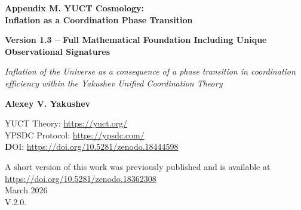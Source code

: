 \documentclass[12pt]{article}
\theoremstyle{remark}
\begin{document}
	
	\begin{titlepage}
		\begin{center}
			\vspace*{0cm}
			
			\Huge\textbf{Appendix M. YUCT Cosmology: \\ Inflation as a Coordination Phase Transition}
			
			\vspace{0cm}
			
			\Large\textbf{Version 1.3 – Full Mathematical Foundation Including Unique Observational Signatures}
			
			\vspace{0cm}
			
			\small\textit{Inflation of the Universe as a consequence of a phase transition in coordination efficiency within the Yakushev Unified Coordination Theory}
			
			\vspace{0,5cm}
			
			\small\textbf{Alexey V. Yakushev}
			
	YUCT Theory: \url{https://yuct.org/}\\
YPSDC Protocol: \url{https://ypsdc.com/}\\


\vspace{2cm}
\textbf DOI: \url{https://doi.org/10.5281/zenodo.18444598}\\

\vspace{1cm}

\vspace{0cm}
\large 
A short version of this work was previously published and is available at\\ \url{https://doi.org/10.5281/zenodo.18362308}\\
\vspace{1cm}
March 2026 \\ \large V.2.0.
			

\end{center}
\end{titlepage}
\end{document}
